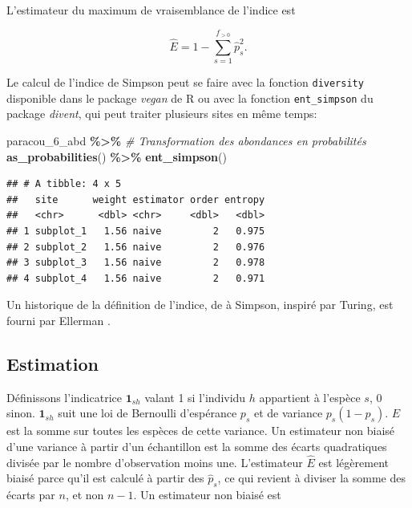 \documentclass[
  11pt,
  american,
  a4paper,
  extrafontsizes,onecolumn,openright
  ]{memoir}
\newenvironment{Shaded}{\begin{snugshade}}{\end{snugshade}}
\newcommand{\CommentTok}[1]{\textcolor[rgb]{0.56,0.35,0.01}{\textit{#1}}}
\newcommand{\FunctionTok}[1]{\textcolor[rgb]{0.13,0.29,0.53}{\textbf{#1}}}
\newcommand{\NormalTok}[1]{#1}
\newcommand{\SpecialCharTok}[1]{\textcolor[rgb]{0.81,0.36,0.00}{\textbf{#1}}}
\begin{document}
L'estimateur du maximum de vraisemblance de l'indice est

\begin{equation}
  \label{eq:EstEML}
  \hat{E} = 1 - \sum^{f_{>0}}_{s=1}{\hat{p}^2_s}.
\end{equation}

Le calcul de l'indice de Simpson peut se faire avec la fonction \texttt{diversity} disponible dans le package \emph{vegan} de R ou avec la fonction \texttt{ent\_simpson} du package \emph{divent}, qui peut traiter plusieurs sites en même temps:

\scriptsize

\begin{Shaded}
\begin{Highlighting}[]
\NormalTok{paracou\_6\_abd }\SpecialCharTok{\%\textgreater{}\%} 
  \CommentTok{\# Transformation des abondances en probabilités}
  \FunctionTok{as\_probabilities}\NormalTok{() }\SpecialCharTok{\%\textgreater{}\%} 
  \FunctionTok{ent\_simpson}\NormalTok{()}
\end{Highlighting}
\end{Shaded}

\begin{verbatim}
## # A tibble: 4 x 5
##   site      weight estimator order entropy
##   <chr>      <dbl> <chr>     <dbl>   <dbl>
## 1 subplot_1   1.56 naive         2   0.975
## 2 subplot_2   1.56 naive         2   0.976
## 3 subplot_3   1.56 naive         2   0.978
## 4 subplot_4   1.56 naive         2   0.971
\end{verbatim}

\normalsize

Un historique de la définition de l'indice, de \textcite{Gini1912} à Simpson, inspiré par Turing, est fourni par Ellerman \autocite*{Ellerman2013}.

\subsection{Estimation}\label{estimation}

Définissons l'indicatrice \({{\mathbf 1}}_{sh}\) valant 1 si l'individu \(h\) appartient à l'espèce \(s\), 0 sinon.
\({{\mathbf 1}}_{sh}\) suit une loi de Bernoulli d'espérance \(p_s\) et de variance \(p_s \left( 1 - p_s \right)\).
\(E\) est la somme sur toutes les espèces de cette variance.
Un estimateur non biaisé d'une variance à partir d'un échantillon est la somme des écarts quadratiques divisée par le nombre d'observation moins une.
L'estimateur \(\hat{E}\) est légèrement biaisé parce qu'il est calculé à partir des \({\hat{p}}_s\), ce qui revient à diviser la somme des écarts par \(n\), et non \(n-1\).
Un estimateur non biaisé est \autocite{Good1953,Lande1996}
\end{document}
